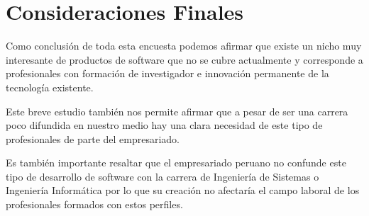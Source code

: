 \section{Consideraciones Finales}

Como conclusión de toda esta encuesta podemos afirmar que existe un nicho muy interesante de productos de software que no se cubre actualmente y corresponde a profesionales con formación de investigador e innovación permanente de la tecnología existente.


Este breve estudio también nos permite afirmar que a pesar de ser una carrera poco difundida en nuestro medio hay una clara necesidad de este tipo de profesionales de parte del empresariado.


Es también importante resaltar que el empresariado peruano no confunde este tipo de desarrollo de software con la carrera de Ingeniería de Sistemas o Ingeniería Informática por lo que su creación no afectaría el campo laboral de los profesionales formados con estos perfiles.
